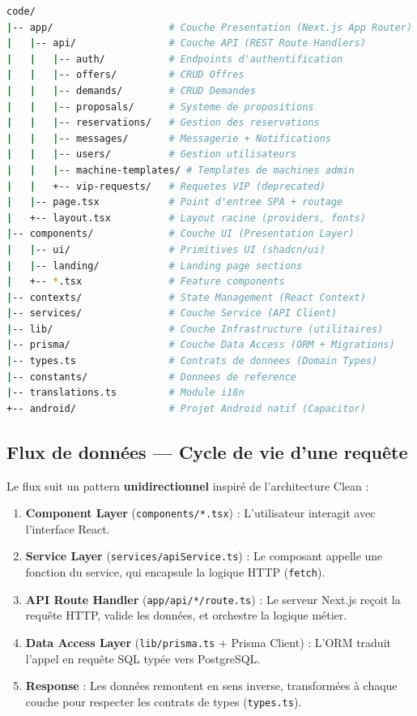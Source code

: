 \documentclass[12pt, a4paper]{article}
\begin{document}
\begin{lstlisting}[language=bash, caption=Structure des couches]
code/
|-- app/                    # Couche Presentation (Next.js App Router)
|   |-- api/                # Couche API (REST Route Handlers)
|   |   |-- auth/           # Endpoints d'authentification
|   |   |-- offers/         # CRUD Offres
|   |   |-- demands/        # CRUD Demandes
|   |   |-- proposals/      # Systeme de propositions
|   |   |-- reservations/   # Gestion des reservations
|   |   |-- messages/       # Messagerie + Notifications
|   |   |-- users/          # Gestion utilisateurs
|   |   |-- machine-templates/ # Templates de machines admin
|   |   +-- vip-requests/   # Requetes VIP (deprecated)
|   |-- page.tsx            # Point d'entree SPA + routage
|   +-- layout.tsx          # Layout racine (providers, fonts)
|-- components/             # Couche UI (Presentation Layer)
|   |-- ui/                 # Primitives UI (shadcn/ui)
|   |-- landing/            # Landing page sections
|   +-- *.tsx               # Feature components
|-- contexts/               # State Management (React Context)
|-- services/               # Couche Service (API Client)
|-- lib/                    # Couche Infrastructure (utilitaires)
|-- prisma/                 # Couche Data Access (ORM + Migrations)
|-- types.ts                # Contrats de donnees (Domain Types)
|-- constants/              # Donnees de reference
|-- translations.ts         # Module i18n
+-- android/                # Projet Android natif (Capacitor)
\end{lstlisting}

\subsection{Flux de données — Cycle de vie d'une requête}

Le flux suit un pattern \textbf{unidirectionnel} inspiré de l'architecture Clean :

\begin{enumerate}[leftmargin=2em]
  \item \textbf{Component Layer} (\texttt{components/*.tsx}) : L'utilisateur interagit avec l'interface React.
  \item \textbf{Service Layer} (\texttt{services/apiService.ts}) : Le composant appelle une fonction du service, qui encapsule la logique HTTP (\texttt{fetch}).
  \item \textbf{API Route Handler} (\texttt{app/api/*/route.ts}) : Le serveur Next.js reçoit la requête HTTP, valide les données, et orchestre la logique métier.
  \item \textbf{Data Access Layer} (\texttt{lib/prisma.ts} + Prisma Client) : L'ORM traduit l'appel en requête SQL typée vers PostgreSQL.
  \item \textbf{Response} : Les données remontent en sens inverse, transformées à chaque couche pour respecter les contrats de types (\texttt{types.ts}).
\end{enumerate}
\end{document}
